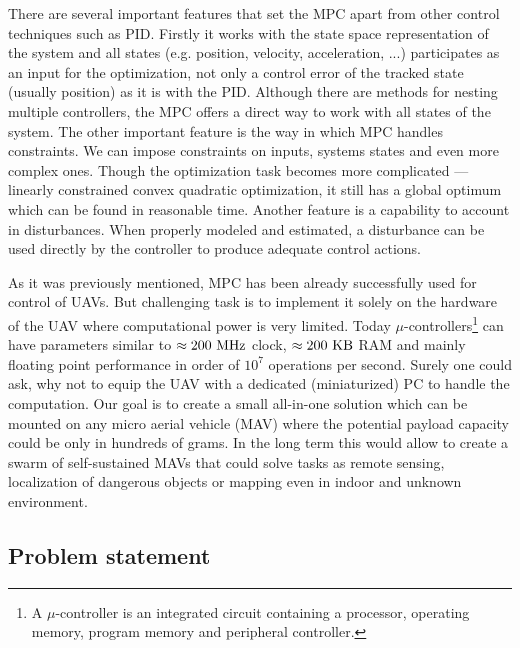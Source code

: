 There are several important features that set the MPC apart from other control techniques such as PID. Firstly it works with the state space representation of the system and all states (e.g. position, velocity, acceleration, ...) participates as an input for the optimization, not only a control error of the tracked state (usually position) as it is with the PID. Although there are methods for nesting multiple controllers, the MPC offers a direct way to work with all states of the system. The other important feature is the way in which MPC handles constraints. We can impose constraints on inputs, systems states and even more complex ones. Though the optimization task becomes more complicated --- linearly constrained convex quadratic optimization, it still has a global optimum which can be found in reasonable time. Another feature is a capability to account in disturbances. When properly modeled and estimated, a disturbance can be used directly by the controller to produce adequate control actions.

As it was previously mentioned, MPC has been already successfully used for control of UAVs. But challenging task is to implement it solely on the hardware of the UAV where computational power is very limited. Today $\mu$-controllers\footnote{A $\mu$-controller is an integrated circuit containing a processor, operating memory, program memory and peripheral controller.} can have parameters similar to $\approx 200 ~\mathrm{MHz}$ clock, $\approx 200 ~\mathrm{KB}$ RAM and mainly floating point performance in order of $10^7$ operations per second. Surely one could ask, why not to equip the UAV with a dedicated (miniaturized) PC to handle the computation. Our goal is to create a small all-in-one solution which can be mounted on any micro aerial vehicle (MAV) where the potential payload capacity could be only in hundreds of grams. In the long term this would allow to create a swarm of self-sustained MAVs that could solve tasks as remote sensing, localization of dangerous objects or mapping even in indoor and unknown environment.

\subsection{Problem statement}

